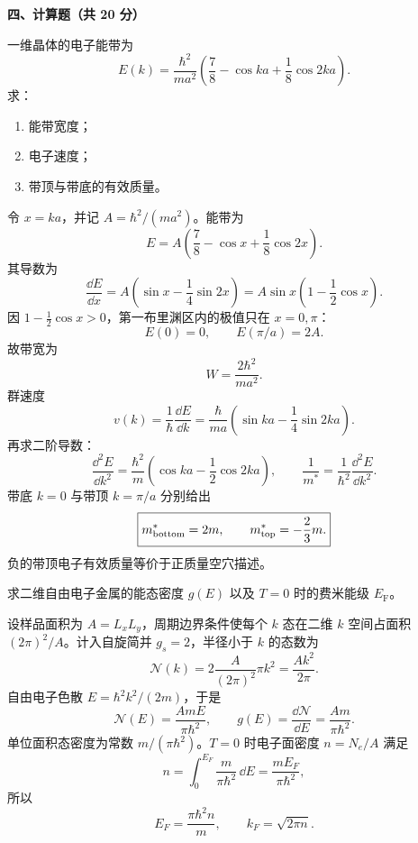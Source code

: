 \textbf{四、计算题（共 20 分）}

\begin{question}[10 分]
一维晶体的电子能带为
\[
 E(k)=\frac{\hbar^2}{ma^2}\left(\frac78-\cos ka+\frac18\cos2ka\right).
\]
求：
\begin{enumerate}
  \item 能带宽度；
  \item 电子速度；
  \item 带顶与带底的有效质量。
\end{enumerate}


\begin{solution}
令 $x=ka$，并记 $A=\hbar^2/(ma^2)$。能带为
\[
 E=A\left(\frac78-\cos x+\frac18\cos2x\right).
\]
其导数为
\[
 \frac{\dd E}{\dd x}=A\left(\sin x-\frac14\sin2x\right)
 =A\sin x\left(1-\frac12\cos x\right).
\]
因 $1-\frac12\cos x>0$，第一布里渊区内的极值只在 $x=0,\pi$：
\[
 E(0)=0,\qquad E(\pi/a)=2A.
\]
故带宽为
\[
 \boxed{W=\frac{2\hbar^2}{ma^2}.}
\]
群速度
\[
 \boxed{v(k)=\frac1\hbar\frac{\dd E}{\dd k}
 =\frac{\hbar}{ma}\left(\sin ka-\frac14\sin2ka\right).}
\]
再求二阶导数：
\[
 \frac{\dd^2E}{\dd k^2}=\frac{\hbar^2}{m}
 \left(\cos ka-\frac12\cos2ka\right),
 \qquad
 \frac1{m^*}=\frac1{\hbar^2}\frac{\dd^2E}{\dd k^2}.
\]
带底 $k=0$ 与带顶 $k=\pi/a$ 分别给出
\[
 \boxed{m^*_{\rm bottom}=2m,\qquad
 m^*_{\rm top}=-\frac23m.}
\]
负的带顶电子有效质量等价于正质量空穴描述。
\end{solution}
\end{question}

\begin{question}[10 分]
求二维自由电子金属的能态密度 $g(E)$ 以及 $T=0$ 时的费米能级 $E_{\mathrm F}$。


\begin{solution}
设样品面积为 $A=L_xL_y$，周期边界条件使每个 $k$ 态在二维 $k$ 空间占面积 $(2\pi)^2/A$。计入自旋简并 $g_s=2$，半径小于 $k$ 的态数为
\[
 \mathcal N(k)=2\frac{A}{(2\pi)^2}\pi k^2=\frac{Ak^2}{2\pi}.
\]
自由电子色散 $E=\hbar^2k^2/(2m)$，于是
\[
 \mathcal N(E)=\frac{AmE}{\pi\hbar^2},
 \qquad
 \boxed{g(E)=\frac{\dd\mathcal N}{\dd E}=\frac{Am}{\pi\hbar^2}.}
\]
单位面积态密度为常数 $m/(\pi\hbar^2)$。$T=0$ 时电子面密度 $n=N_e/A$ 满足
\[
 n=\int_0^{E_F}\frac{m}{\pi\hbar^2}\,\dd E
 =\frac{mE_F}{\pi\hbar^2},
\]
所以
\[
 \boxed{E_F=\frac{\pi\hbar^2n}{m},\qquad
 k_F=\sqrt{2\pi n}.}
\]
\end{solution}
\end{question}
